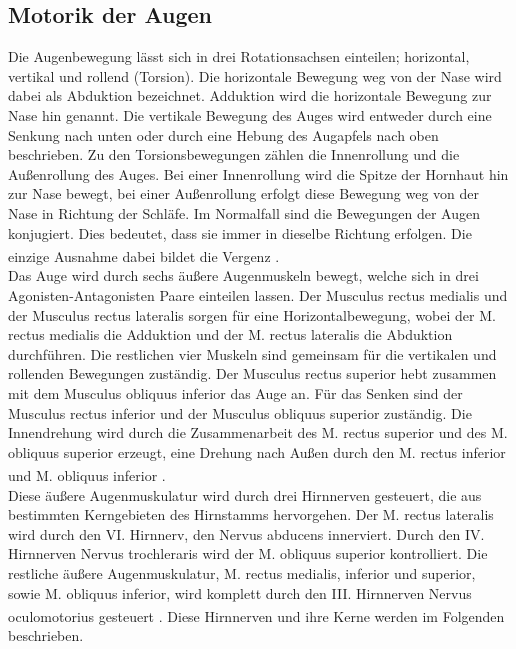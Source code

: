 
\subsection{Motorik der Augen} 
Die Augenbewegung lässt sich in drei Rotationsachsen einteilen; horizontal, vertikal und rollend (Torsion). Die horizontale Bewegung weg von der Nase wird dabei als Abduktion bezeichnet. Adduktion wird die horizontale Bewegung zur Nase hin genannt. Die vertikale Bewegung des Auges wird entweder durch eine Senkung nach unten oder durch eine Hebung des Augapfels nach oben beschrieben. Zu den Torsionsbewegungen zählen die Innenrollung und die Außenrollung des Auges. Bei einer Innenrollung wird die Spitze der Hornhaut hin zur Nase bewegt, bei einer Außenrollung erfolgt diese Bewegung weg von der Nase in Richtung der Schläfe. Im Normalfall sind die Bewegungen der Augen konjugiert. Dies bedeutet, dass sie immer in dieselbe Richtung erfolgen. Die einzige Ausnahme dabei bildet die Vergenz \textsuperscript{\cite[Kap.~39]{kandel2013principles}}. \\
Das Auge wird durch sechs äußere Augenmuskeln bewegt, welche sich in drei Agonisten-Antagonisten Paare einteilen lassen. Der Musculus rectus medialis und der Musculus rectus lateralis sorgen für eine Horizontalbewegung, wobei der M. rectus medialis die Adduktion und der M. rectus lateralis die Abduktion durchführen. Die restlichen vier Muskeln sind gemeinsam für die vertikalen und rollenden Bewegungen zuständig. Der Musculus rectus superior hebt zusammen mit dem Musculus obliquus inferior das Auge an. Für das Senken sind der Musculus rectus inferior und der Musculus obliquus superior zuständig. Die Innendrehung wird durch die Zusammenarbeit des M. rectus superior und des M. obliquus superior erzeugt, eine Drehung nach Außen durch den M. rectus inferior und M. obliquus inferior \textsuperscript{\cite[Kap.~39]{kandel2013principles}}. \\  
Diese äußere Augenmuskulatur wird durch drei Hirnnerven gesteuert, die aus bestimmten Kerngebieten des Hirnstamms hervorgehen. Der M. rectus lateralis wird durch den VI. Hirnnerv, den Nervus abducens innerviert. Durch den IV. Hirnnerven Nervus trochleraris wird der M. obliquus superior kontrolliert. Die restliche äußere Augenmuskulatur, M. rectus medialis, inferior und superior, sowie M. obliquus inferior, wird komplett durch den III. Hirnnerven Nervus oculomotorius gesteuert \textsuperscript{\cite[Kap.~39]{kandel2013principles}}. Diese Hirnnerven und ihre Kerne werden im Folgenden beschrieben.   

